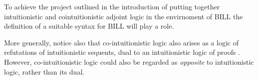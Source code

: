 To achieve the project outlined in the introduction of putting together intuitionistic and cointuitionistic adjoint logic 
in the envirnoment of BILL the definition of a suitable syntax for BILL will play a role. 

More generally, notice also that co-intuitionistic logic also arises as a logic of refutations of intuitionistic sequents,
 dual to an intuitionistic logic of proofs \cite{Tranchini}.
However, co-intuitionistic logic could also be regarded as \emph{opposite} to intuitionistic logic, rather than its dual.
